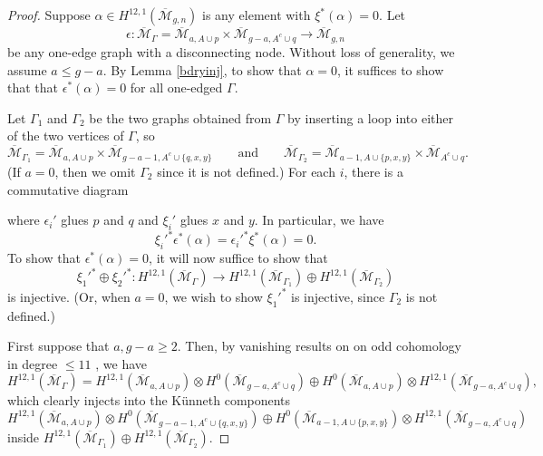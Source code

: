 \documentclass[12pt]{amsart}
\theoremstyle{definition}
\numberwithin{equation}{section}
\newcommand{\M}{\mathcal{M}}
\newcommand{\Mb}{\overline{\M}}
\theoremstyle{definition} %
\theoremstyle{remark}
\begin{document}
\begin{proof}
Suppose $\alpha \in H^{12,1}(\Mb_{g,n})$ is any element with $\xi^*(\alpha) = 0$.
Let 
\[\epsilon\colon \Mb_{\Gamma} = \Mb_{a, A \cup p} \times \Mb_{g - a, A^c \cup q} \to \Mb_{g,n}
\]
be any one-edge graph with a disconnecting node. Without loss of generality, we assume $a \leq g -a$.
By Lemma \ref{bdryinj}, to show that $\alpha  = 0$, it suffices to show that that $\epsilon^*(\alpha) = 0$ for all one-edged $\Gamma$.


Let $\Gamma_1$ and $\Gamma_2$ be the two graphs obtained from $\Gamma$ by inserting a loop into either of the two vertices of $\Gamma$, so
\[\Mb_{\Gamma_1} = \Mb_{a, A \cup p} \times \Mb_{g-a-1,A^c \cup \{q, x, y\}} \qquad \text{and} \qquad \Mb_{\Gamma_2} = \Mb_{a - 1, A \cup \{p, x, y\}} \times \Mb_{A^c \cup q}.\]
(If $a = 0$, then we omit $\Gamma_2$ since it is not defined.)
For each $i$, there is a commutative diagram
\begin{center}
\end{center}
where $\epsilon_i'$ glues $p$ and $q$ and $\xi_i'$ glues $x$ and $y$. In particular, we have
\[\xi_i'^*\epsilon^*(\alpha) = \epsilon_i'^*\xi^*(\alpha) = 0. \]
To show that $\epsilon^*(\alpha) = 0$, it will now suffice to show that 
\[\xi_1'^* \oplus \xi_2'^*\colon H^{12,1}(\Mb_{\Gamma}) \to H^{12,1}(\Mb_{\Gamma_1}) \oplus H^{12,1}(\Mb_{\Gamma_2})\]
is injective. (Or, when $a = 0$, we wish to show $\xi_1'^*$ is injective, since $\Gamma_2$ is not defined.)

First suppose that $a, g - a\geq 2$. Then, by vanishing results on on odd cohomology in degree $\leq 11$ \cite{ArbarelloCornalba,BergstromFaberPayne,CanningLarsonPayne}, we have
\begin{equation} \label{init} H^{12,1}(\Mb_{\Gamma}) = H^{12,1}(\Mb_{a, A \cup p}) \otimes H^{0}(\Mb_{g-a,A^c \cup q}) \oplus H^{0}(\Mb_{a, A \cup p}) \otimes H^{12,1}(\Mb_{g-a,A^c \cup q}), \end{equation}
which clearly injects into the K\"unneth components
\[H^{12,1}(\Mb_{a, A \cup p}) \otimes H^0(\Mb_{g - a - 1, A^c \cup \{q, x, y\}}) \oplus H^0(\Mb_{a-1, A \cup \{p, x, y\}}) \otimes H^{12,1}(\Mb_{g-a,A^c \cup q}) \]
inside $H^{12,1}(\Mb_{\Gamma_1}) \oplus H^{12,1}(\Mb_{\Gamma_2})$.


\end{proof}
\end{document}
